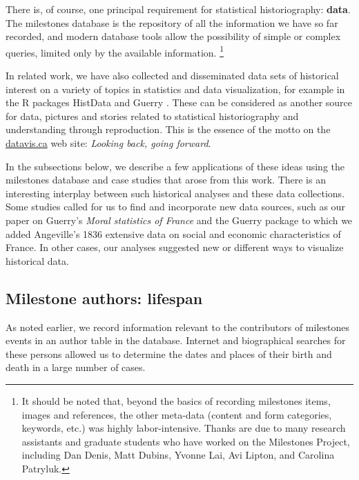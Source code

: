 \documentclass[11pt]{article}
\begin{document}
There is, of course,  one principal requirement for statistical historiography: \textbf{data}.
The milestones database is the repository of all the information we have so far recorded,
and modern database tools allow the possibility of simple or complex queries, limited only
by the available information.
\footnote{
  It should be noted that, beyond the basics of recording milestones items, images and references,
  the other meta-data (content and form categories, keywords, etc.) was highly labor-intensive.
  Thanks are due to many research assistants and graduate students who have worked on the Milestones
  Project, including
  Dan Denis,
  Matt Dubins,
  Yvonne Lai,
  Avi Lipton, and
  Carolina Patryluk.
}

In related work, we have also collected and disseminated
data sets of historical interest on a variety of
topics in statistics and data visualization, for example in the R packages
HistData \citep{HistData} and Guerry \citep{Guerry}. These can be considered as
another source for data, pictures and stories
related to statistical historiography and understanding through reproduction.
This is the essence of the motto on the \url{datavis.ca} web site:
\emph{Looking back, going forward}.


In the subsections below, we describe a few applications of these ideas using the milestones
database and case studies that arose from this work. There is an interesting interplay between
such historical analyses and these data collections. Some studies called for us to find and
incorporate new data sources, such as our paper \citep{Friendly:2007:guerry} on
Guerry's \emph{Moral statistics of France} and the Guerry package to which we added
Angeville's 1836
extensive data on social and economic characteristics of France.
In other cases, our analyses suggested new or different ways to visualize historical data.

\subsection{Milestone authors: lifespan}\label{sec:lifespan}
As noted earlier, we record information relevant to the contributors of milestones events in an
author table in the database. Internet and biographical searches for these persons allowed us
to determine the dates and places of their birth and death in a large number of cases.
\end{document}
